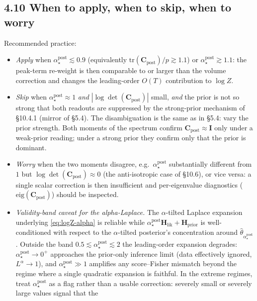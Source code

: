 \documentclass[11pt]{article}
\begin{document}
\subsection*{4.10 When to apply, when to skip, when to worry}

Recommended practice:
\begin{itemize}
\item \emph{Apply} when $\alpha_\star^{\mathrm{post}} \lesssim 0.9$
(equivalently $\mathrm{tr}(\mathbf C_{\mathrm{post}})/p \gtrsim 1.1$) or
$\alpha_\star^{\mathrm{post}} \gtrsim 1.1$: the peak-term re-weight is then
comparable to or larger than the volume correction and changes the
leading-order $O(T)$ contribution to $\log Z$.
\item \emph{Skip} when $\alpha_\star^{\mathrm{post}} \approx 1$ \emph{and}
$|\log\det(\mathbf C_{\mathrm{post}})|$ small, \emph{and} the prior is not so
strong that both readouts are suppressed by the strong-prior mechanism of
\S10.4.1 (mirror of \S5.4). The disambiguation is the same as in \S5.4: vary
the prior strength. Both moments of the spectrum confirm
$\mathbf C_{\mathrm{post}} \approx \mathbf I$ only under a weak-prior reading;
under a strong prior they confirm only that the prior is dominant.
\item \emph{Worry} when the two moments disagree, e.g.\
$\alpha_\star^{\mathrm{post}}$ substantially different from $1$ but
$\log\det(\mathbf C_{\mathrm{post}}) \approx 0$ (the anti-isotropic case of
\S10.6), or vice versa: a single scalar correction is then insufficient and
per-eigenvalue diagnostics ($\mathrm{eig}(\mathbf C_{\mathrm{post}})$) should
be inspected.
\item \emph{Validity-band caveat for the alpha-Laplace.} The $\alpha$-tilted
Laplace expansion underlying \eqref{eq:logZ-alpha} is reliable while
$\alpha_\star^{\mathrm{post}}\mathbf H_{\mathrm{lik}}
+ \mathbf H_{\mathrm{prior}}$ is well-conditioned with respect to the
$\alpha$-tilted posterior's concentration around
$\hat\theta_{\alpha_\star^{\mathrm{post}}}$. Outside the band $0.5 \lesssim
\alpha_\star^{\mathrm{post}} \lesssim 2$ the leading-order expansion degrades:
$\alpha_\star^{\mathrm{post}} \to 0^+$ approaches the prior-only inference
limit (data effectively ignored, $L^{\alpha} \to 1$), and
$\alpha_\star^{\mathrm{post}} \gg 1$ amplifies any score--Fisher mismatch
beyond the regime where a single quadratic expansion is faithful. In the
extreme regimes, treat $\alpha_\star^{\mathrm{post}}$ as a flag rather than a
usable correction: severely small or severely large values signal that the

\end{itemize}
\end{document}

